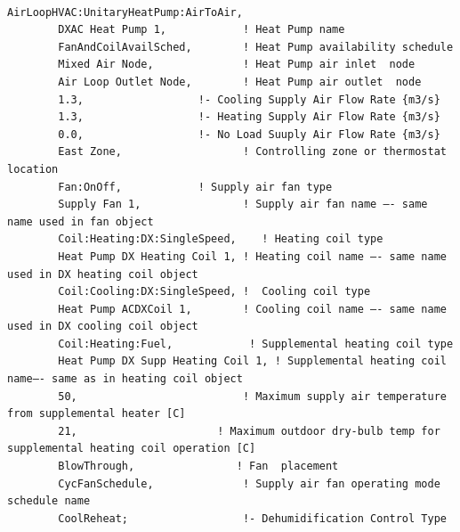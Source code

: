 \begin{lstlisting}

AirLoopHVAC:UnitaryHeatPump:AirToAir,
        DXAC Heat Pump 1,            ! Heat Pump name
        FanAndCoilAvailSched,        ! Heat Pump availability schedule
        Mixed Air Node,              ! Heat Pump air inlet  node
        Air Loop Outlet Node,        ! Heat Pump air outlet  node
        1.3,                  !- Cooling Supply Air Flow Rate {m3/s}
        1.3,                  !- Heating Supply Air Flow Rate {m3/s}
        0.0,                  !- No Load Suuply Air Flow Rate {m3/s}
        East Zone,                   ! Controlling zone or thermostat location
        Fan:OnOff,            ! Supply air fan type
        Supply Fan 1,                ! Supply air fan name –- same name used in fan object
        Coil:Heating:DX:SingleSpeed,    ! Heating coil type
        Heat Pump DX Heating Coil 1, ! Heating coil name –- same name used in DX heating coil object
        Coil:Cooling:DX:SingleSpeed, !  Cooling coil type
        Heat Pump ACDXCoil 1,        ! Cooling coil name –- same name used in DX cooling coil object
        Coil:Heating:Fuel,            ! Supplemental heating coil type
        Heat Pump DX Supp Heating Coil 1, ! Supplemental heating coil name–- same as in heating coil object
        50,                          ! Maximum supply air temperature from supplemental heater [C]
        21,                      ! Maximum outdoor dry-bulb temp for supplemental heating coil operation [C]
        BlowThrough,                ! Fan  placement
        CycFanSchedule,              ! Supply air fan operating mode schedule name
        CoolReheat;                  !- Dehumidification Control Type


\end{lstlisting}
